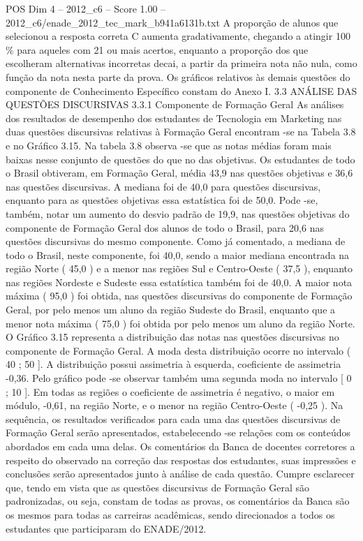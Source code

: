 \begin{textsample}{POS Dim 4 – 2012\_c6 – Score 1.00 – 2012\_c6/enade\_2012\_tec\_mark\_b941a6131b.txt}
A proporção de alunos que selecionou a resposta correta C aumenta gradativamente, chegando a atingir 100 \% para aqueles com 21 ou mais acertos, enquanto a proporção dos que escolheram alternativas incorretas decai, a partir da primeira nota não nula, como função da nota nesta parte da prova.
Os gráficos relativos às demais questões do componente de Conhecimento Específico constam do Anexo I. 3.3 ANÁLISE DAS QUESTÕES DISCURSIVAS 3.3.1 Componente de Formação Geral As análises dos resultados de desempenho dos estudantes de Tecnologia em Marketing nas duas questões discursivas relativas à Formação Geral encontram -se na Tabela 3.8 e no Gráfico 3.15.
Na tabela 3.8 observa -se que as notas médias foram mais baixas nesse conjunto de questões do que no das objetivas.
Os estudantes de todo o Brasil obtiveram, em Formação Geral, média 43,9 nas questões objetivas e 36,6 nas questões discursivas.
A mediana foi de 40,0 para questões discursivas, enquanto para as questões objetivas essa estatística foi de 50,0.
Pode -se, também, notar um aumento do desvio padrão de 19,9, nas questões objetivas do componente de Formação Geral dos alunos de todo o Brasil, para 20,6 nas questões discursivas do mesmo componente.
Como já comentado, a mediana de todo o Brasil, neste componente, foi 40,0, sendo a maior mediana encontrada na região Norte ( 45,0 ) e a menor nas regiões Sul e Centro-Oeste ( 37,5 ), enquanto nas regiões Nordeste e Sudeste essa estatística também foi de 40,0.
A maior nota máxima ( 95,0 ) foi obtida, nas questões discursivas do componente de Formação Geral, por pelo menos um aluno da região Sudeste do Brasil, enquanto que a menor nota máxima ( 75,0 ) foi obtida por pelo menos um aluno da região Norte.
O Gráfico 3.15 representa a distribuição das notas nas questões discursivas no componente de Formação Geral.
A moda desta distribuição ocorre no intervalo ( 40 ; 50 ].
A distribuição possui assimetria à esquerda, coeficiente de assimetria -0,36.
Pelo gráfico pode -se observar também uma segunda moda no intervalo [ 0 ; 10 ].
Em todas as regiões o coeficiente de assimetria é negativo, o maior em módulo, -0,61, na região Norte, e o menor na região Centro-Oeste ( -0,25 ).
Na sequência, os resultados verificados para cada uma das questões discursivas de Formação Geral serão apresentados, estabelecendo -se relações com os conteúdos abordados em cada uma delas.
Os comentários da Banca de docentes corretores a respeito do observado na correção das respostas dos estudantes, suas impressões e conclusões serão apresentados junto à análise de cada questão.
Cumpre esclarecer que, tendo em vista que as questões discursivas de Formação Geral são padronizadas, ou seja, constam de todas as provas, os comentários da Banca são os mesmos para todas as carreiras acadêmicas, sendo direcionados a todos os estudantes que participaram do ENADE/2012.

\end{textsample}
